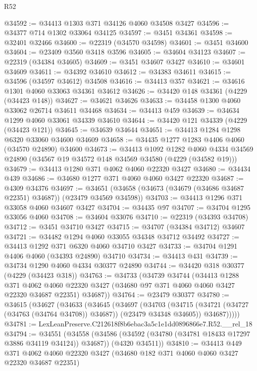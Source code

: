 \begin{lexlean}{R52}
\begin{coremodule}
@34592 := @34413 @1303 @371 @34126 @4060 @34508 @3427
@34596 := @34377 @714 @1302 @33064 @34125
@34597 := @3451 @34361
@34598 := @32401 @32466
@34600 := @22319 (@34570 @34598)
@34601 := @3451 @34600
@34604 := @23409 @3560 @3418 @3596
@34605 := @34604 @34123
@34607 := @22319 (@34384 @34605)
@34609 := @3451 @34607 @3427
@34610 := @34601 @34609
@34611 := @34392 @34610
@34612 := @34383 @34611
@34615 := @34596 (@34597 @34612) @34508
@34616 := @34413 @357
@34621 := @34616 @1301 @4060 @33063 @34361 @34612
@34626 := @34420 @148 @34361 (@4229 (@34423 @148))
@34627 := @34621 @34626
@34633 := @34458 @1300 @4060 @33062 @26714 @34611 @34468
@34634 := @34413 @459
@34639 := @34634 @1299 @4060 @33061 @34339 @34610
@34644 := @34420 @121 @34339 (@4229 (@34423 @121))
@34645 := @34639 @34644
@34651 := @34413 @1284 @1298 @6320 @33060 @34600 @34609
@34658 := @34435 @1277 @1283 @4406 @4060 (@34570 @24890) @34600
@34673 := @34413
    @1092
    @1282
    @4060
    @4334
    @34569
    @24890
    (@34567 @19 @34572 @148 @34569 @34580 (@4229 (@34582 @19)))
@34679 := @34413 @1280 @371 @4062 @4060 @22320 @3427
@34680 := @34434 @439
@34686 := @34680 @1277 @371 @4060 @4060 @3427 @22320
@34687 := @4309 @34376
@34697 := @34651 (@34658 (@34673 (@34679 (@34686 @34687 @22351) @34687)) (@23479 @34569 @34598))
@34703 := @34413 @1296 @371 @33058 @4060 @34607 @3427
@34704 := @34435 @97
@34707 := @34704 @1295 @33056 @4060
@34708 := @34604 @33076
@34710 := @22319 (@34393 @34708)
@34712 := @3451 @34710 @3427
@34715 := @34707 (@34384 @34712) @34607
@34721 := @34482 @1294 @4060 @33055 @34348 @34712 @34492
@34727 := @34413 @1292 @371 @6320 @4060 @34710 @3427
@34733 := @34704 @1291 @4406 @4060 (@34393 @24890) @34710
@34734 := @34413 @431
@34739 := @34734 @1290 @4060 @4334 @30377 @24890
@34744 := @34420 @318 @30377 (@4229 (@34423 @318))
@34763 := @34733
    (@34739
      @34744
      (@34413
        @1288
        @371
        @4062
        @4060
        @22320
        @3427
        (@34680 @97 @371 @4060 @4060 @3427 @22320 @34687 @22351)
        @34687))
@34764 := @23479 @30377
@34780 := @34615
    (@34627
      (@34633
        (@34645
          (@34697
            (@34703
              (@34715 (@34721 (@34727 (@34763 (@34764 @34708)) @34687)) (@23479 @34348 @34605))
              @34687)))))
@34781 := LexLeanPreserve.C212618f8b6ebac3a5c1e1dd0896866e7.R52.__rel_18
@34794 := @34551
    (@34558
      (@34586 (@34592 (@34780 (@34781 @18433 @17297 @3886 @34119 @34124)) @34687))
      (@4320 @34511))
@34810 := @34413
    @449
    @371
    @4062
    @4060
    @22320
    @3427
    (@34680 @182 @371 @4060 @4060 @3427 @22320 @34687 @22351)

\end{coremodule}
\end{lexlean}
